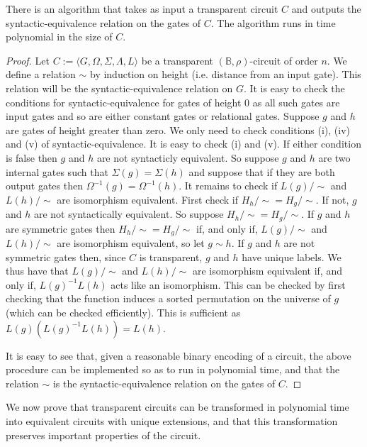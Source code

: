 \documentclass[../paper.tex]{subfiles}
\begin{document}
\begin{lem}
  There is an algorithm that takes as input a transparent circuit $C$ and
  outputs the syntactic-equivalence relation on the gates of $C$. The algorithm
  runs in time polynomial in the size of $C$.
  \label{lem:unique-labels-syntactic-equiv}
\end{lem}
\begin{proof}
  Let $C := \langle G, \Omega, \Sigma, \Lambda, L \rangle$ be a transparent
  $(\mathbb{B}, \rho)$-circuit of order $n$. We define a relation $\sim$ by
  induction on height (i.e. distance from an input gate). This relation will be
  the syntactic-equivalence relation on $G$. It is easy to check the conditions
  for syntactic-equivalence for gates of height 0 as all such gates are input
  gates and so are either constant gates or relational gates. Suppose $g$ and
  $h$ are gates of height greater than zero. We only need to check conditions
  (i), (iv) and (v) of syntactic-equivalence. It is easy to check (i) and (v).
  If either condition is false then $g$ and $h$ are not syntacticly equivalent.
  So suppose $g$ and $h$ are two internal gates such that $\Sigma (g) =
  \Sigma(h)$ and suppose that if they are both output gates then $\Omega^{-1}(g)
  = \Omega^{-1}(h)$. It remains to check if $L(g)/{\sim}$ and $L(h)/{\sim}$ are
  isomorphism equivalent. First check if $H_h /{\sim} = H_g /{\sim}$. If not,
  $g$ and $h$ are not syntactically equivalent. So suppose $H_h /{\sim} = H_g
  /{\sim}$. If $g$ and $h$ are symmetric gates then $H_h /{\sim} = H_g/{\sim}$
  if, and only if, $L(g)/{\sim}$ and $L(h)/{\sim}$ are isomorphism equivalent,
  so let $g \sim h$. If $g$ and $h$ are not symmetric gates then, since $C$ is
  transparent, $g$ and $h$ have unique labels. We thus have that $L(g)/{\sim}$
  and $L(h)/{\sim}$ are isomorphism equivalent if, and only if, $L(g)^{-1}L(h)$
  acts like an isomorphism. This can be checked by first checking that the
  function induces a sorted permutation on the universe of $g$ (which can be
  checked efficiently). This is sufficient as $L(g)(L(g)^{-1}L(h)) = L(h)$.

  It is easy to see that, given a reasonable binary encoding of a circuit, the
  above procedure can be implemented so as to run in polynomial time, and that
  the relation $\sim$ is the syntactic-equivalence relation on the gates of $C$.
 
\end{proof}

We now prove that transparent circuits can be transformed in polynomial time
into equivalent circuits with unique extensions, and that this transformation
preserves important properties of the circuit.
\end{document}
